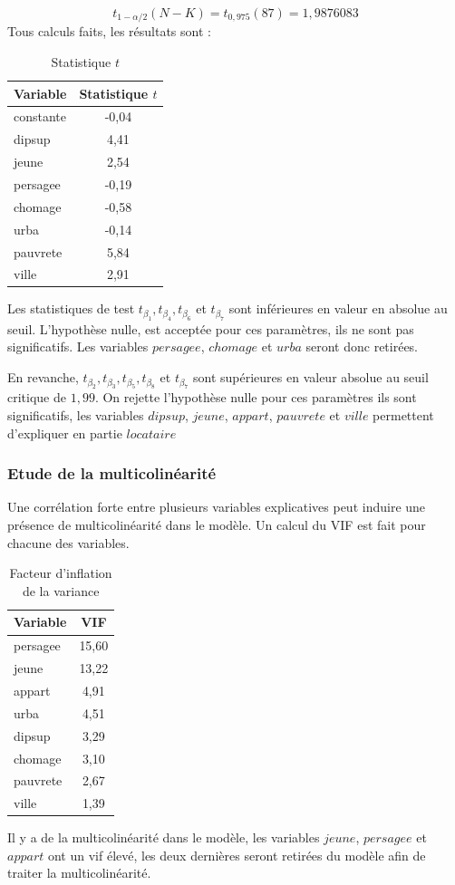 \documentclass[12pt]{article}
\begin{document}
\begin{equation*}
    t_{1-\alpha/2}(N-K) = t_{0,975}(87) = 1,9876083 
\end{equation*}
Tous calculs faits, les résultats sont :
\begin{table}[H]
\centering
\caption{Statistique $t$}
\begin{tabular}{l*{1}{|c}}
\toprule
Variable            &Statistique $t$\\
\midrule
constante &     -0,04\\
dipsup&         4,41\\
jeune&          2,54\\
persagee&       -0,19\\
chomage&        -0,58\\
urba   &        -0,14\\
pauvrete&       5,84\\
ville &         2,91\\
\bottomrule
\end{tabular}
\end{table}
Les statistiques de test $t_{\beta_1},t_{\beta_4},t_{\beta_6}$ et $t_{\beta_7}$ sont inférieures en valeur en absolue au seuil. L'hypothèse nulle, est
acceptée pour ces paramètres, ils ne sont pas significatifs. Les variables $persagee$, $chomage$ et $urba$ seront donc retirées.

En revanche, $t_{\beta_2}, t_{\beta_3}, t_{\beta_5}, t_{\beta_8}$ et $t_{\beta_7}$ sont supérieures en valeur absolue au seuil critique de $1,99$. On rejette l'hypothèse nulle pour ces paramètres
ils sont significatifs, les variables $dipsup$, $jeune$, $appart$, $pauvrete$ et $ville$ permettent d'expliquer en partie $locataire$
\subsubsection{Etude de la multicolinéarité}
Une corrélation forte entre plusieurs variables explicatives peut induire une présence de multicolinéarité dans le modèle. Un calcul du VIF est fait pour chacune des variables.
\begin{table}[H]
\centering
\caption{Facteur d'inflation de la variance}
\begin{tabular}{l*{1}{|c}}
\toprule
Variable            &         VIF\\
\midrule
persagee &     15,60  \\
jeune &    13,22 \\
appart &     4,91 \\
urba &    4,51\\
dipsup &   3,29\\
chomage &      3,10 \\
pauvrete &      2,67\\
ville &   1,39\\
\bottomrule
\end{tabular}
\end{table}
Il y a de la multicolinéarité dans le modèle, les variables $jeune$, $persagee$ et $appart$ ont un vif
élevé, les deux dernières seront retirées du modèle afin de traiter la multicolinéarité.
\end{document}
